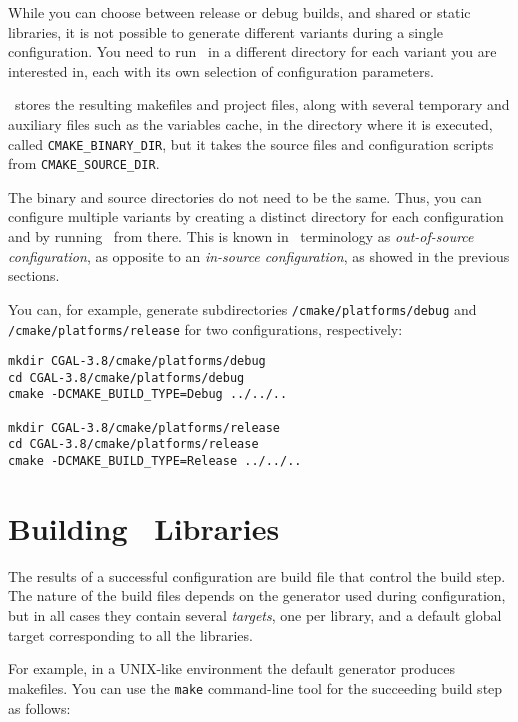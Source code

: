 While you can choose between release or debug builds, and shared or static libraries,
it is not possible to generate different variants during a single configuration. You need to run \cmake\ in a 
different directory for each variant you are interested in, each with its own selection of configuration parameters.

\cmake\ stores the resulting makefiles and project files, along with several temporary and auxiliary files such
as the variables cache, in the directory where it is executed, called \texttt{CMAKE\_BINARY\_DIR}, but it
takes the source files and configuration scripts from
\texttt{CMAKE\_SOURCE\_DIR}.

The binary and source directories do not need to be the same. Thus, you can configure multiple variants by creating a
distinct directory for each configuration and by running \cmake\ from there. This is known in \cmake\ terminology
as  {\em out-of-source configuration}, as opposite to an {\em in-source
  configuration}, as showed in the previous sections.

You can, for example, generate subdirectories \cgaldir{}\texttt{/cmake/platforms/debug} and 
\cgaldir{}\texttt{/cmake/platforms/release} for two configurations, respectively:

{\ccTexHtml{\scriptsize}{}
\begin{verbatim}
mkdir CGAL-3.8/cmake/platforms/debug
cd CGAL-3.8/cmake/platforms/debug
cmake -DCMAKE_BUILD_TYPE=Debug ../../..

mkdir CGAL-3.8/cmake/platforms/release
cd CGAL-3.8/cmake/platforms/release
cmake -DCMAKE_BUILD_TYPE=Release ../../..
\end{verbatim}
}

\section{Building \cgal\ Libraries}

The results of a successful configuration are build file that control the build step.
The nature of the build files depends on the generator used during configuration, but in all cases they 
contain several {\em targets}, one per library,  and a default global target corresponding 
to all the libraries.

For example, in a UNIX-like environment the default generator produces
makefiles. You can use the \texttt{make} command-line tool for the
succeeding build step as follows:


